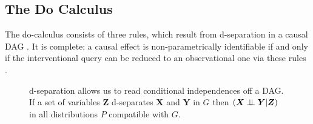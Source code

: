 \documentclass[b0,landscape,25pt]{sciposter}
\begin{document}
\begin{multicols}{5}
\subsection*{The Do Calculus}

The do-calculus consists of three rules, which result from d-separation in a causal DAG \cite{Pearl2000}. It is complete: a causal effect is non-parametrically identifiable if and only if the interventional query can be reduced to an observational one via these rules \cite{Shpitser2008}. 

\begin{figure}
\caption{d-separation allows us to read conditional independences off a DAG. If a set of variables $\boldsymbol{Z}$ d-separates $\boldsymbol{X}$ and $\boldsymbol{Y}$ in $G$ then ${(\boldsymbol{X} \perp\!\!\!\perp \boldsymbol{Y}|\boldsymbol{Z})}$ in all distributions $P$ compatible with $G$. }
\label{fig:dsep}
\centering
{}
\end{figure}


\end{multicols}
\end{document}
